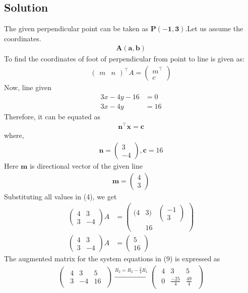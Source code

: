 \documentclass[12pt]{article}
\let\vec\mathbf
\newcommand{\myvec}[1]{\ensuremath{\begin{pmatrix}#1\end{pmatrix}}}
\let\vec\mathbf
\begin{document}
\begin{enumerate}
\section{Solution}
The given perpendicular point can be taken as $\vec{P(-1,3)}$.Let us assume the coordinates.
\begin{align}
\vec{A(a,b)}
\end{align}
To find the coordinates of foot of perpendicular from point to line is given as:
\begin{align}
\myvec{
m&n
}^\top A = \myvec{
m^\top\\
c
}
\end{align}
Now, line given 
\begin{align}
3x-4y-16 &=0\\
3x-4y&=16
\end{align}
Therefore, it can be equated as
\begin{align}
\vec{n}^\top \vec{x} = \vec{c}      \label{4}
\end{align}
where,
\begin{align}
\vec{n}=\myvec{
3\\
-4
}, \vec{c}=16
\end{align}
Here $\vec{m}$ is directional vector of the given line
\begin{align}
\vec{m}=\myvec{
4\\3}
\end{align}
Substituting all values in (4), we get
\begin{align}
\myvec
{4&3\\3&-4}A&=\myvec{(4&3)&\myvec{-1\\3}\\&16}\\
\myvec
{4&3\\3&-4}A&=\myvec{5\\16}  \label{9}
\end{align}
The augmented matrix for the system equations in (9) is expressed as
\begin{align}
  \begin{pmatrix}
  \begin{array}{rr|r}
   4 &  3  & 5\\
   3 & -4  & 16 
  \end{array}
  \end{pmatrix}\xrightarrow[]{R_2=R_2-\frac{3}{4}R_1}
  \begin{pmatrix}
  \begin{array}{rr|r}
  4 & 3 & 5\\
  0 & \frac{-25}{4} & \frac{49}{4}

\end{array}
\end{pmatrix}
\end{align}
\end{enumerate}
\end{document}

